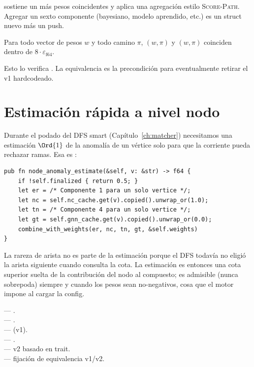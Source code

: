  sostiene un
 más pesos coincidentes y
aplica una agregación estilo \textsc{Score-Path}. Agregar un
sexto componente (bayesiano, modelo aprendido, etc.) es un
struct nuevo más un  push.

\begin{theorem}[Equivalencia v1/v2]
Para todo vector de pesos $w$ y todo camino $\pi$,
$(w, \pi)$ y
$(w, \pi)$ coinciden dentro
de $8 \cdot \varepsilon_{\text{f64}}$.
\end{theorem}

Esto lo verifica . La
equivalencia es la precondición para eventualmente retirar el v1
hardcodeado.

\section{Estimación rápida a nivel nodo}

Durante el podado del DFS smart (Capítulo~\ref{ch:matcher})
necesitamos una estimación $\Ord{1}$ de la anomalía de un vértice
solo para que la  corriente pueda
rechazar ramas. Esa es :

\begin{lstlisting}[style=rust]
pub fn node_anomaly_estimate(&self, v: &str) -> f64 {
    if !self.finalized { return 0.5; }
    let er = /* Componente 1 para un solo vertice */;
    let nc = self.nc_cache.get(v).copied().unwrap_or(1.0);
    let tn = /* Componente 4 para un solo vertice */;
    let gt = self.gnn_cache.get(v).copied().unwrap_or(0.0);
    combine_with_weights(er, nc, tn, gt, &self.weights)
}
\end{lstlisting}

La rareza de arista no es parte de la estimación porque el DFS
todavía no eligió la arista siguiente cuando consulta la cota.
La estimación es entonces una cota superior suelta de la
contribución del nodo al compuesto; es admisible (nunca
sobrepoda) siempre y cuando los pesos sean no-negativos, cosa
que el motor impone al cargar la config.

\begin{inthecode}
 ---
.\\
 ---
.\\
 ---
 (v1).\\
 ---
.\\
 --- v2 basado en trait.\\
 ---
fijación de equivalencia v1/v2.
\end{inthecode}
